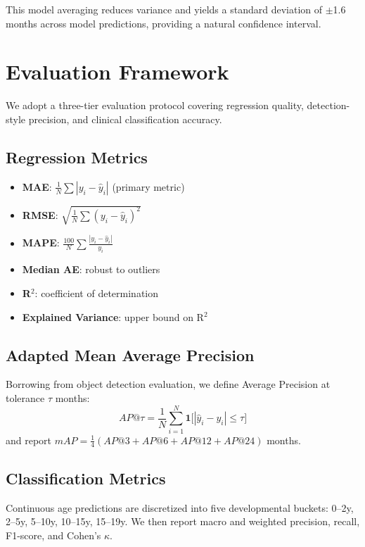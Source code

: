 \documentclass[conference]{IEEEtran}
\begin{document}
This model averaging reduces variance and yields a standard deviation
of $\pm$1.6 months across model predictions, providing a natural
confidence interval.

\section{Evaluation Framework}

We adopt a three-tier evaluation protocol covering regression quality,
detection-style precision, and clinical classification accuracy.

\subsection{Regression Metrics}

\begin{itemize}
  \item \textbf{MAE}: $\frac{1}{N}\sum|y_i - \hat{y}_i|$ (primary metric)
  \item \textbf{RMSE}: $\sqrt{\frac{1}{N}\sum(y_i-\hat{y}_i)^2}$
  \item \textbf{MAPE}: $\frac{100}{N}\sum\frac{|y_i-\hat{y}_i|}{y_i}$
  \item \textbf{Median AE}: robust to outliers
  \item \textbf{R$^2$}: coefficient of determination
  \item \textbf{Explained Variance}: upper bound on R$^2$
\end{itemize}

\subsection{Adapted Mean Average Precision}

Borrowing from object detection evaluation, we define
Average Precision at tolerance $\tau$ months:
\[
AP@\tau = \frac{1}{N}\sum_{i=1}^{N}
  \mathbf{1}\bigl[|\hat{y}_i - y_i| \leq \tau\bigr]
\]
and report $mAP = \frac{1}{4}(AP@3 + AP@6 + AP@12 + AP@24)$ months.

\subsection{Classification Metrics}

Continuous age predictions are discretized into five developmental
buckets: 0--2y, 2--5y, 5--10y, 10--15y, 15--19y. We then report
macro and weighted precision, recall, F1-score, and Cohen's $\kappa$.
\end{document}
